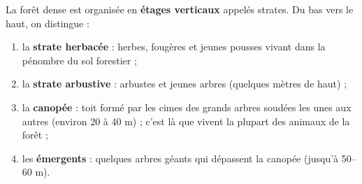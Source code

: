 \documentclass[11pt]{article}
\newcommand{\cle}[1]{{\popxbold\color{popdark}#1}}
\begin{document}
\begin{definition}
La forêt dense est organisée en \textbf{étages verticaux} appelés \cle{strates}. Du bas vers le haut, on distingue :
\begin{enumerate}
\item la \textbf{strate herbacée} : herbes, fougères et jeunes pousses vivant dans la pénombre du sol forestier ;
\item la \textbf{strate arbustive} : arbustes et jeunes arbres (quelques mètres de haut) ;
\item la \textbf{canopée} : toit formé par les cimes des grands arbres soudées les unes aux autres (environ 20 à 40 m) ; c'est là que vivent la plupart des animaux de la forêt ;
\item les \textbf{émergents} : quelques arbres géants qui dépassent la canopée (jusqu'à 50--60 m).
\end{enumerate}
\end{definition}
\end{document}
